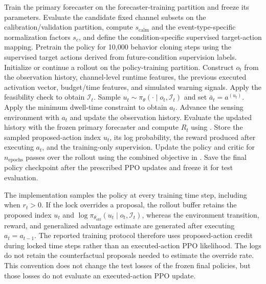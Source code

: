 \begin{algorithm}[htbp]
\caption{PD-PPO policy training}
\label{alg:pdppo_training}
\small
\begin{algorithmic}
\State Train the primary forecaster on the forecaster-training partition and
freeze its parameters.
\State Evaluate the candidate fixed channel subsets on the calibration/validation partition,
compute $s_{\mathrm{calm}}$ and the event-type-specific normalization factors
$s_c$, and define the condition-specific supervised target-action mapping.
\State Pretrain the policy for 10,000 behavior cloning steps using the
supervised target actions derived from future-condition supervision labels.
  \State Initialize or continue a rollout on the policy-training partition.
    \State Construct $o_t$ from the observation history, channel-level runtime
    features, the previous executed activation vector, budget/time features, and
    simulated warning signals.
    \State Apply the feasibility check to obtain $\mathcal{I}_t$.
    \State Sample
    $u_t\sim\pi_{\theta}(\cdot\mid o_t,\mathcal{I}_t)$ and set
    $\bar a_t=a^{(u_t)}$.
    \State Apply the minimum dwell-time constraint to obtain $a_t$.
    \State Advance the sensing environment with $a_t$ and update the observation history.
    \State Evaluate the updated history with the frozen primary forecaster and compute
    $R_t$ using .
    \State Store the sampled proposed-action index $u_t$, its log probability,
    the reward produced after executing $a_t$, and the training-only supervision.
  \EndFor
  \State Update the policy and critic for $n_{\mathrm{epochs}}$ passes over the
  rollout using the combined objective in .
\EndFor
\State Save the final policy checkpoint after the prescribed PPO updates and
freeze it for test evaluation.
\end{algorithmic}
\end{algorithm}

The implementation samples the policy at every training time step, including
when $r_t>0$. If the lock overrides a proposal, the rollout buffer retains the
proposed index $u_t$ and $\log\pi_{\theta_{\mathrm{old}}}
(u_t\mid o_t,\mathcal{I}_t)$, whereas the environment transition, reward, and
generalized advantage estimate are generated after executing
$a_t=a_{t-1}$. The reported training protocol therefore uses proposed-action
credit during locked time steps rather than an executed-action PPO likelihood.
The logs do not retain the counterfactual proposals needed to estimate the
override rate. This convention does not change the test losses of the frozen
final policies, but those losses do not evaluate an executed-action PPO update.

